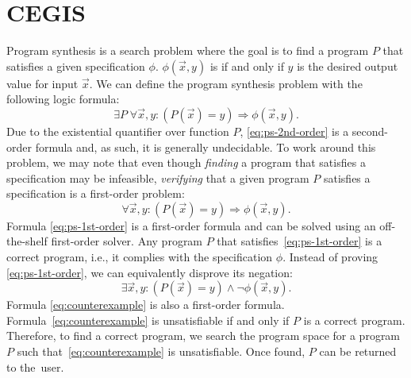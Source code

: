 \section{\acl{CEGIS}}\label{sec:cegis}

Program synthesis is a search problem where the goal is to find a program \(P\) that satisfies a given specification \(\phi\).
\(\phi(\vec{x}, y)\) is \true{} if and only if \(y\) is the desired output value for input \(\vec{x}\).
We can define the program synthesis problem with the following logic formula:
%
\begin{equation}\label{eq:ps-2nd-order}
\exists P \; \forall \vec{x}, y : (P(\vec{x}) = y) \Rightarrow \phi(\vec{x}, y).
\end{equation}
%
\noindent
Due to the existential quantifier over function \(P\), \eqref{eq:ps-2nd-order} is a second-order formula and, as such, it is generally undecidable. 
To work around this problem, we may note that even though \textit{finding} a program that satisfies a specification may be infeasible, \textit{verifying} that a given program \(P\) satisfies a specification is a first-order problem:
%
\begin{equation}\label{eq:ps-1st-order}
\forall \vec{x}, y : (P(\vec{x}) = y) \Rightarrow \phi(\vec{x}, y).
\end{equation}
%
Formula \eqref{eq:ps-1st-order} is a first-order formula and can be solved using an off-the-shelf first-order solver. Any program \(P\) that satisfies~\eqref{eq:ps-1st-order} is a correct program, i.e., it complies with the specification \(\phi\).
Instead of proving \eqref{eq:ps-1st-order}, we can equivalently disprove its negation:
%
\begin{equation}\label{eq:counterexample}
\exists \vec{x}, y : (P(\vec{x}) = y) \wedge \neg \phi(\vec{x}, y).
\end{equation}
%
Formula \eqref{eq:counterexample} is also a first-order formula.
Formula~\eqref{eq:counterexample} is unsatisfiable if and only if \(P\) is a correct program.
Therefore, to find a correct program, we search the program space for a program \(P\) such that~\eqref{eq:counterexample} is unsatisfiable. Once found, \(P\) can be returned to the~user. %

